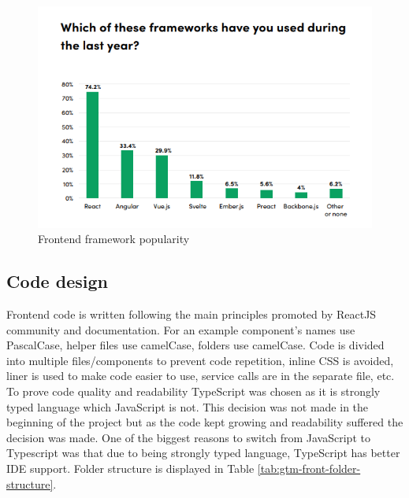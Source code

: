 \begin{figure}[h]
    \includegraphics[width=\textwidth]{figures/frontend_framework_popularity}
    \caption{Frontend framework popularity~\cite{state-of-frontend-report}}
    \label{fig:frontend-framework-popularity}
\end{figure}

\subsection{Code design}\label{subsec:code-design}
Frontend code is written following the main principles promoted by ReactJS community and documentation.
For an example component's names use PascalCase, helper files use camelCase, folders use camelCase.
Code is divided into multiple files/components to prevent code repetition, inline CSS is avoided, liner is used to make code easier to use, service calls are in the separate file, etc.
To prove code quality and readability TypeScript was chosen as it is strongly typed language which JavaScript is not.
This decision was not made in the beginning of the project but as the code kept growing and readability suffered the decision was made.
One of the biggest reasons to switch from JavaScript to Typescript was that due to being strongly typed language,
TypeScript has better IDE support.
Folder structure is displayed in Table
\ref{tab:gtm-front-folder-structure}.

